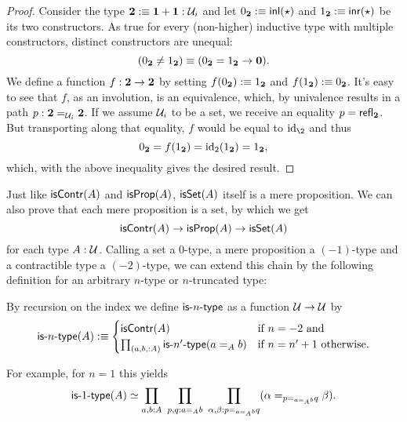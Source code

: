 \begin{proof}
Consider the type $\mathbf{2} :\equiv \mathbf{1} + \mathbf{1} : \mathcal{U}_i$ and let
$0_{\mathbf{2}} :\equiv \mathsf{inl}(\star)$ and $1_{\mathbf{2}} :\equiv \mathsf{inr}(\star)$ be its
two constructors.
As true for every (non-higher) inductive type with multiple constructors,
distinct constructors are unequal: %
\begin{equation*}
(0_{\mathbf{2}} \neq 1_{\mathbf{2}}) \equiv (0_{\mathbf{2}} = 1_{\mathbf{2}} \to \mathbf{0}) \text{.}
\end{equation*}
We define a function $f : \mathbf{2} \to \mathbf{2}$ by setting $f(0_{\mathbf{2}}) :\equiv 1_{\mathbf{2}}$
and $f(1_{\mathbf{2}}) :\equiv 0_{\mathbf{2}}$.
It's easy to see that $f$, as an involution, is an equivalence, which, by univalence
results in a path $p : \mathbf{2} =_{\mathcal{U}_i} \mathbf{2}$.
If we assume $\mathcal{U}_i$ to be a set, we receive an equality $p = \mathsf{refl}_{\mathbf{2}}$.
But transporting along that equality, $f$ would be equal to $\id_\2$ and thus
\begin{equation*}
0_{\mathbf{2}} = f(1_{\mathbf{2}}) = \operatorname{id}_2(1_{\mathbf{2}}) = 1_{\mathbf{2}} \text{,}
\end{equation*}
which, with the above inequality gives the desired result.
\end{proof}

Just like $\mathsf{isContr}(A)$ and $\mathsf{isProp}(A)$, $\mathsf{isSet}(A)$ itself is a mere proposition.
We can also prove that each mere proposition is a set, by which we get
\begin{equation*}
\mathsf{isContr}(A) \to \mathsf{isProp}(A) \to \mathsf{isSet}(A)
\end{equation*}
for each type $A : \mathcal{U}$. Calling a set a 0-type, a mere proposition a $(-1)$-type
and a contractible type a $(-2)$-type, we can extend this chain by the following
definition for an arbitrary $n$-type or $n$-truncated type:
\begin{defn}
By recursion on the index we define $\mathsf{is}\mbox{-}{n}\mbox{-}\mathsf{type}$ as a function $\mathcal{U} \to \mathcal{U}$ by
\begin{equation*}
\mathsf{is}\mbox{-}{n}\mbox{-}\mathsf{type}(A) :\equiv \begin{cases}
\mathsf{isContr}(A) & \text{if $n = -2$ and} \\
\prod_{(a, b, : A)} \mathsf{is}\mbox{-}{n'}\mbox{-}\mathsf{type}(a =_A b) & \text{if $n = n' + 1$ otherwise.}
\end{cases}
\end{equation*}
\end{defn}

For example, for $n = 1$ this yields
\begin{equation*}
\mathsf{is}\mbox{-}{1}\mbox{-}\mathsf{type}(A) \simeq \prod_{a, b : A} ~ \prod_{p, q : a =_A b}
	~ \prod_{\alpha, \beta : p =_{a =_A b} q} (\alpha =_{p =_{a =_A b} q} \beta) \text{.}
\end{equation*}



